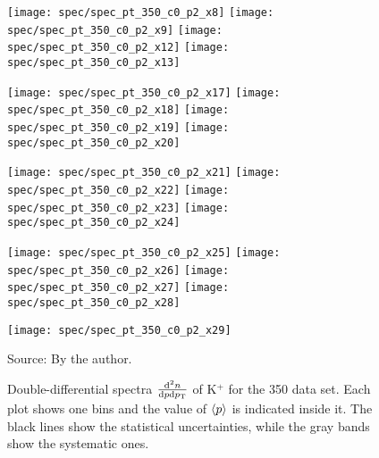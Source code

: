 \begin{figure}[!ht]
  \centering

  \texttt{[image: spec/spec\_pt\_350\_c0\_p2\_x8]}
  \texttt{[image: spec/spec\_pt\_350\_c0\_p2\_x9]}
  \texttt{[image: spec/spec\_pt\_350\_c0\_p2\_x12]}
  \texttt{[image: spec/spec\_pt\_350\_c0\_p2\_x13]}

  \texttt{[image: spec/spec\_pt\_350\_c0\_p2\_x17]}
  \texttt{[image: spec/spec\_pt\_350\_c0\_p2\_x18]}
  \texttt{[image: spec/spec\_pt\_350\_c0\_p2\_x19]}
  \texttt{[image: spec/spec\_pt\_350\_c0\_p2\_x20]}

  \texttt{[image: spec/spec\_pt\_350\_c0\_p2\_x21]}
  \texttt{[image: spec/spec\_pt\_350\_c0\_p2\_x22]}
  \texttt{[image: spec/spec\_pt\_350\_c0\_p2\_x23]}
  \texttt{[image: spec/spec\_pt\_350\_c0\_p2\_x24]}

  \texttt{[image: spec/spec\_pt\_350\_c0\_p2\_x25]}
  \texttt{[image: spec/spec\_pt\_350\_c0\_p2\_x26]}
  \texttt{[image: spec/spec\_pt\_350\_c0\_p2\_x27]}
  \texttt{[image: spec/spec\_pt\_350\_c0\_p2\_x28]}

  \texttt{[image: spec/spec\_pt\_350\_c0\_p2\_x29]}
 
  \caption{Double-differential spectra $\frac{\text{d}^2n}{\text{d}p\text{d}p_\text{T}}$
    of K$^+$ for the 350 \GeVc data set. Each plot shows one \pp bins and the value
    of $\langle p\rangle$ is indicated inside it. The black lines show the statistical
    uncertainties, while the gray bands show the systematic ones.}
  \label{fig:hadron:spec:dedx:all350:c0p2}
  \begin{center}
    \small Source: By the author. 
  \end{center}
\end{figure}

